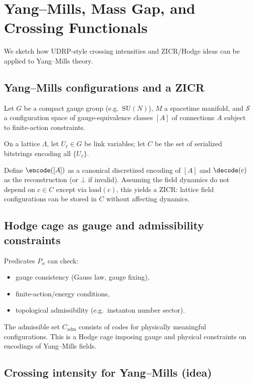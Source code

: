\documentclass[11pt]{article}
\theoremstyle{definition}
\begin{document}
\section{Yang--Mills, Mass Gap, and Crossing Functionals}

We sketch how UDRP-style crossing intensities and ZICR/Hodge ideas can be applied to Yang--Mills theory.

\subsection{Yang--Mills configurations and a ZICR}

Let $G$ be a compact gauge group (e.g.\ $\mathrm{SU}(N)$), $M$ a spacetime manifold, and $\mathcal{S}$ a configuration space of gauge-equivalence classes $[A]$ of connections $A$ subject to finite-action constraints.

On a lattice $\Lambda$, let $U_\ell \in G$ be link variables; let $C$ be the set of serialized bitstrings encoding all $\{U_\ell\}$.

Define $\encode([A])$ as a canonical discretized encoding of $[A]$ and $\decode(c)$ as the reconstruction (or $\bot$ if invalid).
Assuming the field dynamics do not depend on $c\in C$ except via $\mathrm{load}(c)$, this yields a ZICR: lattice field configurations can be stored in $C$ without affecting dynamics.

\subsection{Hodge cage as gauge and admissibility constraints}

Predicates $P_\alpha$ can check:
\begin{itemize}
  \item gauge consistency (Gauss law, gauge fixing),
  \item finite-action/energy conditions,
  \item topological admissibility (e.g.\ instanton number sector).
\end{itemize}
The admissible set $C_{\mathrm{adm}}$ consists of codes for physically meaningful configurations. This is a Hodge cage imposing gauge and physical constraints on encodings of Yang--Mills fields.

\subsection{Crossing intensity for Yang--Mills (idea)}
\end{document}

